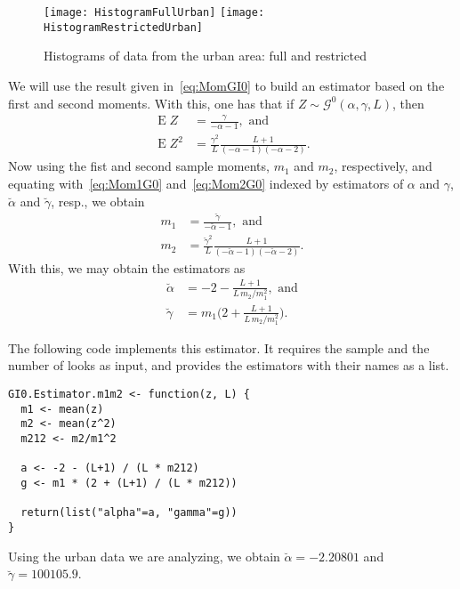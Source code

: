 \begin{figure}[hbt]
\centering
\texttt{[image: HistogramFullUrban]}
\texttt{[image: HistogramRestrictedUrban]}
\caption{Histograms of data from the urban area: full and restricted}\label{Fig:HistogramsUrbanAreas}
\end{figure}

We will use the result given in~\eqref{eq:MomGI0} to build an estimator based on the first and second moments.
With this, one has that if $Z\sim\mathcal{G}^0(\alpha,\gamma,L)$, then
\begin{align}
\operatorname{E}Z	&= \frac{\gamma}{-\alpha-1}, \text{ and } \label{eq:Mom1G0} \\
\operatorname{E}Z^2	&= \frac{\gamma^2}{L}\frac{L+1}{(-\alpha-1)(-\alpha-2)}. \label{eq:Mom2G0}
\end{align}
Now using the fist and second sample moments, $m_1$ and $m_2$, respectively, and equating with~\eqref{eq:Mom1G0} and~\ref{eq:Mom2G0} indexed by estimators of $\alpha$ and $\gamma$, $\breve{\alpha}$ and $\breve{\gamma}$, resp., we obtain
\begin{align}
m_1	&= \frac{\breve\gamma}{-\breve\alpha-1}, \text{ and } \label{eq:SMom1G0} \\
m_2	&= \frac{\breve\gamma^2}{L}\frac{L+1}{(-\breve\alpha-1)(-\breve\alpha-2)}. \label{eq:SMom2G0}
\end{align}
With this, we may obtain the estimators as
\begin{align}
\breve{\alpha}	& = -2-\frac{L+1}{L\, m_2/m_1^2}, \text{ and} \label{Eq:EstMoma}\\
\breve\gamma		& = m_1 \Big(2+\frac{L+1}{L\, m_2/m_1^2}\Big).\label{Eq:EstMomb}
\end{align}

The following code implements this estimator.
It requires the sample and the number of looks as input,
and provides the estimators with their names as a list.

\begin{lstlisting}[frame=lines]
GI0.Estimator.m1m2 <- function(z, L) {
  m1 <- mean(z)
  m2 <- mean(z^2)
  m212 <- m2/m1^2
    
  a <- -2 - (L+1) / (L * m212)
  g <- m1 * (2 + (L+1) / (L * m212))
  
  return(list("alpha"=a, "gamma"=g))
}
\end{lstlisting}

Using the urban data we are analyzing, we obtain
$\breve{\alpha}=-2.20801$ and $\breve\gamma=100105.9$.


